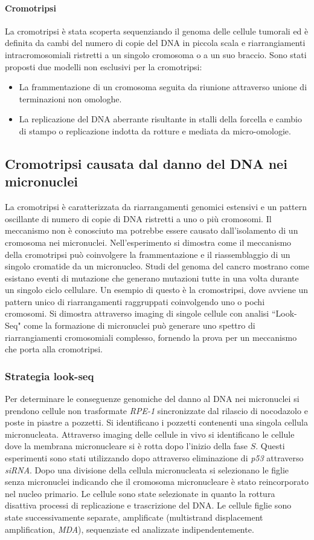 \paragraph{Cromotripsi}
La cromotripsi \`e stata scoperta sequenziando il genoma delle cellule tumorali ed \`e definita da cambi del numero di copie del DNA in piccola scala e riarrangiamenti intracromosomiali 
ristretti a un singolo cromosoma o a un suo braccio. Sono stati proposti due modelli non esclusivi per la cromotripsi:
\begin{itemize}
	\item La frammentazione di un cromosoma seguita da riunione attraverso unione di terminazioni non omologhe.
	\item La replicazione del DNA aberrante risultante in stalli della forcella e cambio di stampo o replicazione indotta da rotture e mediata da micro-omologie.
\end{itemize}
\subsection{Cromotripsi causata dal danno del DNA nei micronuclei}
La cromotripsi \`e caratterizzata da riarrangamenti genomici estensivi e un pattern oscillante di numero di copie di DNA ristretti a uno o pi\`u cromosomi. Il meccanismo non \`e 
conosciuto ma potrebbe essere causato dall'isolamento di un cromosoma nei micronuclei. Nell'esperimento si dimostra come il meccanismo della cromotripsi pu\`o coinvolgere la 
frammentazione e il riassemblaggio di un singolo cromatide da un micronucleo. Studi del genoma del cancro mostrano come esistano eventi di mutazione che generano mutazioni tutte in 
una volta durante un singolo ciclo cellulare. Un esempio di questo \`e la cromostripsi, dove avviene un pattern unico di riarrangamenti raggruppati coinvolgendo uno o pochi cromosomi. 
Si dimostra attraverso imaging di singole cellule con analisi ``Look-Seq" come la formazione di micronuclei pu\`o generare uno spettro di riarrangiamenti cromosomiali complesso, fornendo
la prova per un meccanismo che porta alla cromotripsi. 
\subsubsection{Strategia look-seq}
Per determinare le conseguenze genomiche del danno al DNA nei micronuclei si prendono cellule non trasformate \emph{RPE-1} sincronizzate dal rilascio di nocodazolo e poste in piastre
a pozzetti. Si identificano i pozzetti contenenti una singola cellula micronucleata. Attraverso imaging delle cellule in vivo si identificano le cellule dove la membrana micronucleare
si \`e rotta dopo l'inizio della fase $S$. Questi esperimenti sono stati utilizzando dopo attraverso eliminazione di \emph{p53} attraverso \emph{siRNA}. Dopo una divisione della cellula
micronucleata si selezionano le figlie senza micronuclei indicando che il cromosoma micronucleare \`e stato reincorporato nel nucleo primario. Le cellule sono state selezionate in quanto
la rottura disattiva processi di replicazione e trascrizione del DNA. Le cellule figlie sono state successivamente separate, amplificate (multistrand displacement amplification, 
\emph{MDA}), sequenziate ed analizzate indipendentemente.
